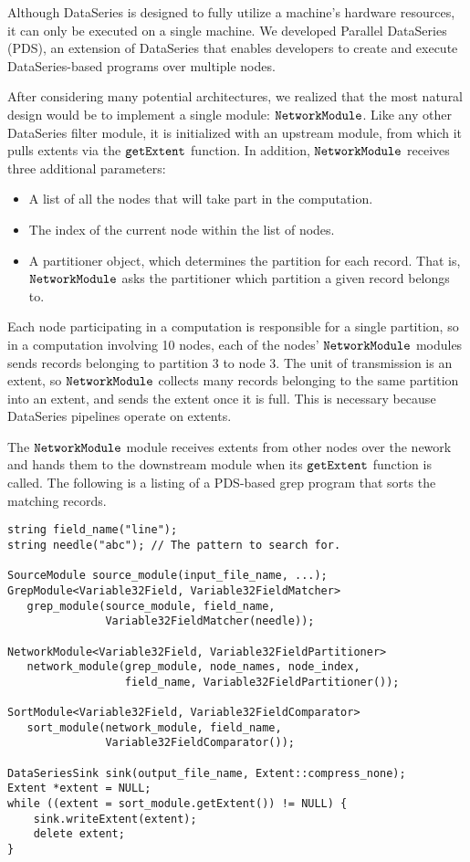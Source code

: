\documentclass{acm_proc_article-sp}
\newenvironment{mylisting}
{\begin{list}{}{\setlength{\leftmargin}{1em}}\item\scriptsize\bfseries}
{\end{list}}
\begin{document}
Although DataSeries is designed to fully utilize a machine's hardware
resources, it can only be executed on a single machine. We developed Parallel
DataSeries (PDS), an extension of DataSeries that enables developers to create
and execute DataSeries-based programs over multiple nodes.

After considering many potential architectures, we realized that the most
natural design would be to implement a single module: $\tt NetworkModule$. Like any other
DataSeries filter module, it is initialized with an upstream module, from which
it pulls extents via the $\tt getExtent$ function. In addition, $\tt
NetworkModule$ receives three additional parameters:
\begin{itemize}
  \item A list of all the nodes that will take part in the computation.
  \item The index of the current node within the list of nodes.
  \item A partitioner object, which determines the partition for each
  record. That is, $\tt NetworkModule$ asks the partitioner which partition a
  given record belongs to.
\end{itemize}

Each node participating in a computation is responsible for a single
partition, so in a computation involving 10 nodes, each of the nodes'
$\tt NetworkModule$ modules sends records belonging to partition 3 to node 3.
The unit of transmission is an extent, so $\tt NetworkModule$ collects many
records belonging to the same partition into an extent, and sends the extent once it is
full. This is necessary because DataSeries pipelines operate on extents.

The $\tt NetworkModule$ module receives extents from other nodes over the
nework and hands them to the downstream module when its $\tt getExtent$ function is called. The
following is a listing of a PDS-based grep program that sorts the matching
records.
\begin{mylisting}
\begin{verbatim}
string field_name("line");
string needle("abc"); // The pattern to search for.

SourceModule source_module(input_file_name, ...);
GrepModule<Variable32Field, Variable32FieldMatcher>
   grep_module(source_module, field_name,
               Variable32FieldMatcher(needle));

NetworkModule<Variable32Field, Variable32FieldPartitioner>
   network_module(grep_module, node_names, node_index,
                  field_name, Variable32FieldPartitioner());

SortModule<Variable32Field, Variable32FieldComparator>
   sort_module(network_module, field_name,
               Variable32FieldComparator());

DataSeriesSink sink(output_file_name, Extent::compress_none);
Extent *extent = NULL;
while ((extent = sort_module.getExtent()) != NULL) {
    sink.writeExtent(extent);
    delete extent;
}
\end{verbatim}
\end{mylisting}
\end{document}
